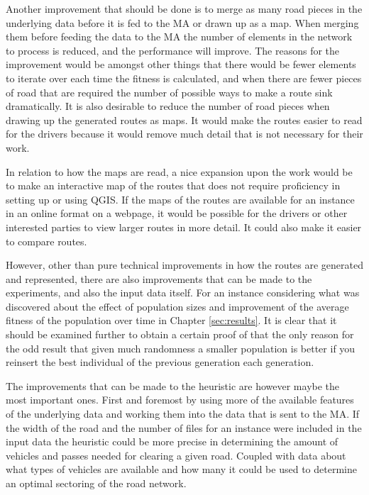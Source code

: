 Another improvement that should be done is to merge as many road pieces in the underlying data before it is fed to the MA or drawn up as a map. When merging them before feeding the data to the MA the number of elements in the network to process is reduced, and the performance will improve. The reasons for the improvement would be amongst other things that there would be fewer elements to iterate over each time the fitness is calculated, and when there are fewer pieces of road that are required the number of possible ways to make a route sink dramatically. It is also desirable to reduce the number of road pieces when drawing up the generated routes as maps. It would make the routes easier to read for the drivers because it would remove much detail that is not necessary for their work.

In relation to how the maps are read, a nice expansion upon the work would be to make an interactive map of the routes that does not require proficiency in setting up or using QGIS. If the maps of the routes are available for an instance in an online format on a webpage, it would be possible for the drivers or other interested parties to view larger routes in more detail. It could also make it easier to compare routes.

However, other than pure technical improvements in how the routes are generated and represented, there are also improvements that can be made to the experiments, and also the input data itself. For an instance considering what was discovered about the effect of population sizes and improvement of the average fitness of the population over time in Chapter \ref{sec:results}. It is clear that it should be examined further to obtain a certain proof of that the only reason for the odd result that given much randomness a smaller population is better if you reinsert the best individual of the previous generation each generation.

The improvements that can be made to the heuristic are however maybe the most important ones. First and foremost by using more of the available features of the underlying data and working them into the data that is sent to the MA. If the width of the road and the number of files for an instance were included in the input data the heuristic could be more precise in determining the amount of vehicles and passes needed for clearing a given road. Coupled with data about what types of vehicles are available and how many it could be used to determine an optimal sectoring of the road network.


